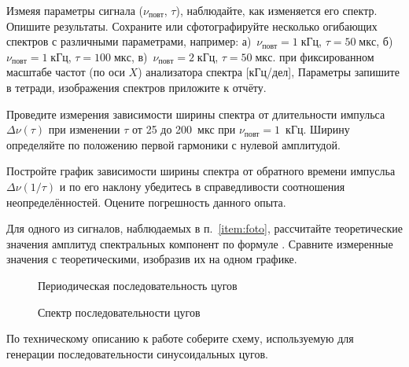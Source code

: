 \begin{lab:task}
\item\label{item:foto} Измеяя параметры сигнала ($\nu_{повт}$, $\tau$),
наблюдайте, как изменяется его спектр. Опишите результаты.
Сохраните или сфотографируйте несколько огибающих спектров с различными
параметрами, например:
а)~$\nu_{повт}=1\;кГц$, $\tau=50\;мкс$,
б)~$\nu_{повт}=1\;кГц$, $\tau=100\;мкс$,
в)~$\nu_{повт}=2\;кГц$, $\tau=50\;мкс$.
при фиксированном масштабе частот (по оси $X$) анализатора спектра [кГц/дел],
Параметры запишите в тетради, изображения спектров приложите к отчёту.

\item Проведите измерения зависимости ширины спектра от длительности
импульса~$\Delta \nu(\tau)$ при изменении $\tau$ от 25 до 200~мкс при
$\nu_\text{повт}=1$~кГц. Ширину определяйте по положению первой гармоники
с нулевой амплитудой.

\item Постройте график зависимости ширины спектра от обратного времени импусльа
$\Delta \nu(1/\tau)$ и по его наклону убедитесь в справедливости соотношения
неопределённостей. Оцените погрешность данного опыта.

\item Для одного из сигналов, наблюдаемых в п.~\ref{item:foto}, рассчитайте теоретические
значения амплитуд спектральных компонент по формуле .
Сравните измеренные значения с теоретическими, изобразив их на одном графике.



\begin{figure}[h!]
\hfil\hfil
\begin{minipage}{0.4\textwidth}
    \missingfigure{}
    \caption{Периодическая последовательность цугов}
\end{minipage}
\hfil
\begin{minipage}{0.4\textwidth}
    \missingfigure{}
    \caption{Спектр последовательности цугов}
\end{minipage}
\end{figure}


\item По техническому описанию к работе соберите схему, используемую
для генерации последовательности синусоидальных цугов.


\end{lab:task}
